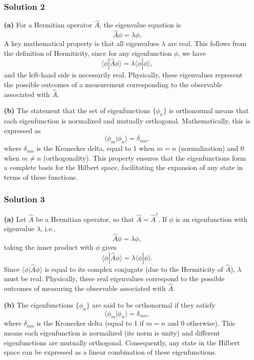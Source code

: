 \documentclass{article}
\begin{document}
\subsubsection{Solution 2}

\textbf{(a)} For a Hermitian operator $\hat{A}$, the eigenvalue equation is 
\[
\hat{A}\phi = \lambda \phi.
\]
A key mathematical property is that all eigenvalues $\lambda$ are real. This follows from the definition of Hermiticity, since for any eigenfunction $\phi$, we have
\[
\langle \phi|\hat{A}\phi\rangle = \lambda \langle \phi|\phi\rangle,
\]
and the left-hand side is necessarily real. Physically, these eigenvalues represent the possible outcomes of a measurement corresponding to the observable associated with $\hat{A}$.

\textbf{(b)} The statement that the set of eigenfunctions $\{\phi_n\}$ is orthonormal means that each eigenfunction is normalized and mutually orthogonal. Mathematically, this is expressed as
\[
\langle \phi_m|\phi_n\rangle = \delta_{mn},
\]
where $\delta_{mn}$ is the Kronecker delta, equal to 1 when $m = n$ (normalization) and 0 when $m \neq n$ (orthogonality). This property ensures that the eigenfunctions form a complete basis for the Hilbert space, facilitating the expansion of any state in terms of these functions.

\subsubsection{Solution 3}
\textbf{(a)} Let $\hat{A}$ be a Hermitian operator, so that $\hat{A} = \hat{A}^\dagger$. If $\phi$ is an eigenfunction with eigenvalue $\lambda$, i.e.,
\[
\hat{A}\phi = \lambda \phi,
\]
taking the inner product with $\phi$ gives
\[
\langle \phi | \hat{A}\phi \rangle = \lambda \langle \phi | \phi \rangle.
\]
Since $\langle \phi | \hat{A}\phi \rangle$ is equal to its complex conjugate (due to the Hermiticity of $\hat{A}$), $\lambda$ must be real. Physically, these real eigenvalues correspond to the possible outcomes of measuring the observable associated with $\hat{A}$.

\bigskip

\textbf{(b)} The eigenfunctions $\{\phi_n\}$ are said to be orthonormal if they satisfy
\[
\langle \phi_m | \phi_n \rangle = \delta_{mn},
\]
where $\delta_{mn}$ is the Kronecker delta (equal to 1 if $m = n$ and 0 otherwise). This means each eigenfunction is normalized (its norm is unity) and different eigenfunctions are mutually orthogonal. Consequently, any state in the Hilbert space can be expressed as a linear combination of these eigenfunctions.
\end{document}
